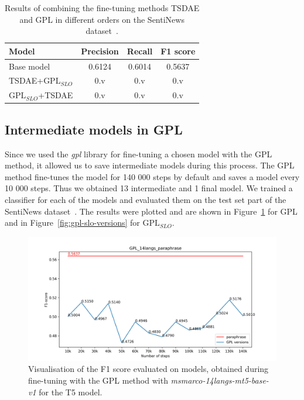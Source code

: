 \documentclass[fleqn,moreauthors,10pt]{ds_report}
\begin{document}
\begin{table}[!h]
	\footnotesize
	\begin{center}
		\begin{tabular}{ |l|c|c|c| }
		\hline
		\rowcolor{Blue}Model & Precision & Recall & F1 score\\
		\hline

		Base model & 0.6124 & 0.6014 & 0.5637\\
		TSDAE+$\text{GPL}_{SLO}$ & 0.v & 0.v & 0.v\\
		$\text{GPL}_{SLO}$+TSDAE &  0.v & 0.v & 0.v\\

		\hline
		\end{tabular}
	\end{center}
\caption{Results of combining the fine-tuning methods TSDAE and GPL in different orders on the SentiNews dataset~\cite{sentiNews}.}
\label{tab3}
\end{table}



\subsection*{Intermediate models in GPL}
\label{intermediate-paraphrase}
Since we used the \textit{gpl} library for fine-tuning a chosen model with the GPL method, it allowed us to save intermediate models during this process. The GPL method fine-tunes the model for 140 000 steps by default and saves a model every 10 000 steps. Thus we obtained 13 intermediate and 1 final model. We trained a classifier for each of the models and evaluated them on the test set part of the SentiNews dataset~\cite{sentiNews}. The results were plotted and are shown in Figure~\ref{fig:gpl-versions} for GPL and in Figure~\ref{fig:gpl-slo-versions} for $\text{GPL}_{SLO}$.

\begin{figure}[ht]\centering
	\vspace{12 pt}
	\includegraphics[width=\linewidth]{GPL_14langs_paraphrase.png}
	\vspace{5 pt}
	\caption{Visualisation of the F1 score evaluated on models, obtained during fine-tuning with the GPL method with {\it msmarco-14langs-mt5-base-v1} \cite{msmarco14langs} for the T5 model.}
	\label{fig:gpl-versions}
\end{figure}
\end{document}
